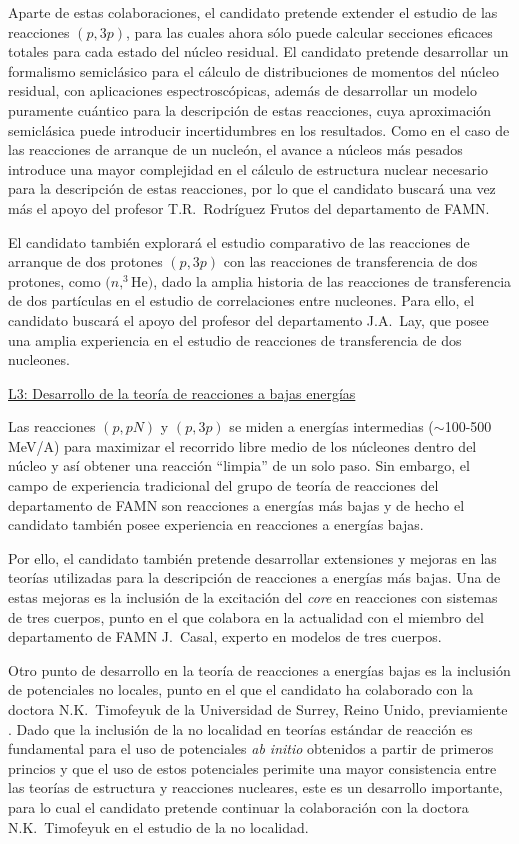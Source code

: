 \documentclass[a4paper,12pt,twoside]{article}
\begin{document}
Aparte de estas colaboraciones, el candidato pretende extender el estudio de las reacciones $(p,3p)$, para las cuales ahora sólo puede calcular secciones eficaces totales para cada estado del núcleo residual. El candidato pretende desarrollar un formalismo semiclásico para el cálculo de distribuciones de momentos del núcleo residual, con aplicaciones espectroscópicas, además de desarrollar un modelo puramente cuántico para la descripción de estas reacciones, cuya aproximación semiclásica puede introducir incertidumbres en los resultados. Como en el caso de las reacciones de arranque de un nucleón, el avance a núcleos más pesados introduce una mayor complejidad en el cálculo de estructura nuclear necesario para la descripción de estas reacciones, por lo que el candidato buscará una vez más el apoyo del profesor T.R.~Rodríguez Frutos del departamento de FAMN.

El candidato también explorará el estudio comparativo de las reacciones de arranque de dos protones $(p,3p)$ con las reacciones de transferencia de dos protones, como $(n,^3$He$)$, dado la amplia historia de las reacciones de transferencia de dos partículas en el estudio de correlaciones entre nucleones. Para ello, el candidato buscará el apoyo del profesor del departamento J.A.~Lay, que posee una amplia experiencia en el estudio de reacciones de transferencia de dos nucleones.

\underline{L3: Desarrollo de la teoría de reacciones a bajas energías}

Las reacciones $(p,pN)$ y $(p,3p)$ se miden a energías intermedias ($\sim$100-500 MeV/A) para maximizar el recorrido libre medio de los núcleones dentro del núcleo y así obtener una reacción ``limpia'' de un solo paso. Sin embargo, el campo de experiencia tradicional del grupo de teoría de reacciones del departamento de FAMN  son reacciones a energías más bajas y de hecho el candidato también posee experiencia en reacciones a energías bajas.

Por ello, el candidato también pretende desarrollar extensiones y mejoras en las teorías utilizadas para la descripción de reacciones a energías más bajas. Una de estas mejoras es la inclusión de la excitación del \textit{core} en reacciones con sistemas de tres cuerpos, punto en el que colabora en la actualidad con el miembro del departamento de FAMN J.~Casal, experto en modelos de tres cuerpos.

Otro punto de desarrollo en la teoría de reacciones a energías bajas es la inclusión de potenciales no locales, punto en el que el candidato ha colaborado con la doctora N.K.~Timofeyuk de la Universidad de Surrey, Reino Unido, previamiente \cite{Tim18,Tim19,Fro23}. Dado que la inclusión de la no localidad en teorías estándar de reacción es fundamental para el uso de potenciales \textit{ab initio} obtenidos a partir de primeros princios y que  el uso de estos potenciales perimite una mayor consistencia entre las teorías de estructura y reacciones nucleares, este es un desarrollo importante, para lo cual el candidato pretende continuar la colaboración con la doctora N.K.~Timofeyuk en el estudio de la no localidad.
\end{document}
